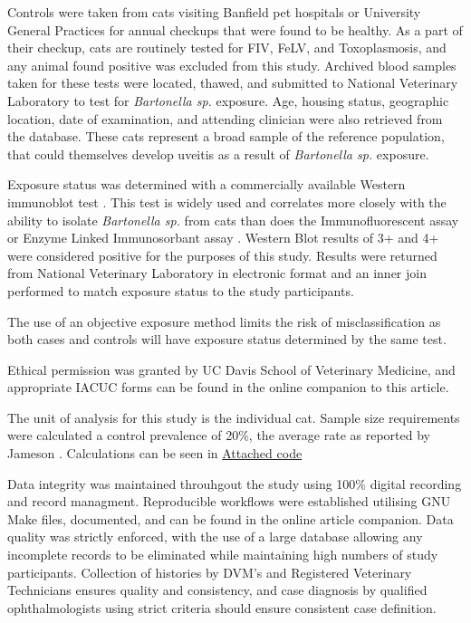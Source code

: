 \documentclass[11pt,twocolumn]{article}
\begin{document}
	Controls were taken from cats visiting Banfield pet hospitals or University General Practices for annual checkups that were found to be healthy. 
	As a part of their checkup, cats are routinely tested for FIV, FeLV, and Toxoplasmosis, and any animal found positive was excluded from this study. 
	Archived blood samples taken for these tests were located, thawed, and submitted to National Veterinary Laboratory to test for \emph{Bartonella sp.} exposure.
	Age, housing status, geographic location, date of examination, and attending clinician  were also retrieved from the database. 
	These cats represent a broad sample of the reference population, that could themselves develop uveitis as a result of \emph{Bartonella sp.} exposure.


	Exposure status was determined with a commercially available Western immunoblot test \cite{febart}. This test is widely used and correlates more closely with the ability to isolate \emph{Bartonella sp.} from cats than does the Immunofluorescent assay or Enzyme Linked Immunosorbant assay \cite{Jr1995}. 
	Western Blot results of 3+ and 4+ were considered positive for the purposes of this study. 
	Results were returned from National Veterinary Laboratory in electronic format and an inner join performed to match exposure status to the study participants.

	The use of an objective exposure method limits the risk of misclassification as both cases and controls will have exposure status determined by the same test.


	Ethical permission was granted by UC Davis School of Veterinary Medicine, and appropriate IACUC forms can be found in the online companion to this article.

	The unit of analysis for this study is the individual cat. 
	Sample size requirements were calculated a control prevalence of 20\%, the average rate as reported by Jameson \cite{Jameson1995a}. Calculations can be seen in \hyperref[fig:samplesizecalc]{Attached code}


	Data integrity was maintained throuhgout the study using 100\% digital recording and record managment. 
	Reproducible workflows were established utilising GNU Make files, documented, and can be found in the online article companion.
	Data quality was strictly enforced, with the use of a large database allowing any incomplete records to be eliminated while maintaining high numbers of study participants.
	Collection of histories by DVM's and Registered Veterinary Technicians ensures quality and consistency, and case diagnosis by qualified ophthalmologists using strict criteria should ensure consistent case definition.
\end{document}
